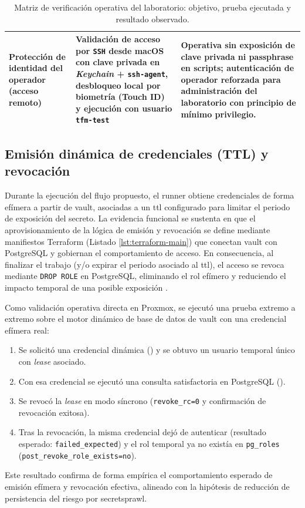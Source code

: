\documentclass[runningheads]{llncs}
\begin{document}
\begin{table}[H]
\begin{tabular}{>{\raggedright\arraybackslash}p{} >{\raggedright\arraybackslash}p{} >{\raggedright\arraybackslash}p{}}
\addlinespace
Protección de identidad del operador (acceso remoto) &
Validación de acceso por \texttt{SSH} desde macOS con clave privada en \textit{Keychain} + \texttt{ssh-agent}, desbloqueo local por biometría (Touch ID) y ejecución con usuario \texttt{tfm-test} &
Operativa sin exposición de clave privada ni passphrase en scripts; autenticación de operador reforzada para administración del laboratorio con principio de mínimo privilegio. \\
\bottomrule
\end{tabular}
\caption{Matriz de verificación operativa del laboratorio: objetivo, prueba ejecutada y resultado observado.}
\label{tab:verificacion-operativa}
\end{table}

\subsection{Emisión dinámica de credenciales (TTL) y revocación}
Durante la ejecución del flujo propuesto, el runner obtiene credenciales de forma efímera a partir de \gls{vault}, asociadas a un \gls{ttl} configurado para limitar el periodo de exposición del secreto. La evidencia funcional se sustenta en que el aprovisionamiento de la lógica de emisión y revocación se define mediante manifiestos Terraform (Listado \ref{lst:terraform-main}) que conectan \gls{vault} con PostgreSQL y gobiernan el comportamiento de acceso. En consecuencia, al finalizar el trabajo (y/o expirar el periodo asociado al \gls{ttl}), el acceso se revoca mediante \texttt{DROP ROLE} en PostgreSQL, eliminando el rol efímero y reduciendo el impacto temporal de una posible exposición \parencite{vault_database_secrets_engine}.

Como validación operativa directa en Proxmox, se ejecutó una prueba extremo a extremo sobre el motor dinámico de base de datos de \gls{vault} con una credencial efímera real:
\begin{enumerate}
    \item Se solicitó una credencial dinámica () y se obtuvo un usuario temporal único con \textit{lease} asociado.
    \item Con esa credencial se ejecutó una consulta satisfactoria en PostgreSQL ().
    \item Se revocó la \textit{lease} en modo síncrono (\texttt{revoke\_rc=0} y confirmación de revocación exitosa).
    \item Tras la revocación, la misma credencial dejó de autenticar (resultado esperado: \texttt{failed\_expected}) y el rol temporal ya no existía en \texttt{pg\_roles} (\texttt{post\_revoke\_role\_exists=no}).
\end{enumerate}
Este resultado confirma de forma empírica el comportamiento esperado de emisión efímera y revocación efectiva, alineado con la hipótesis de reducción de persistencia del riesgo por \gls{secretsprawl}.
\end{document}

